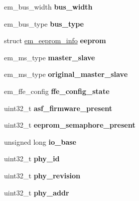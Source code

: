\begin{DoxyCompactItemize}
em\+\_\+bus\+\_\+width {\bfseries bus\+\_\+width}
\item 
\mbox{\label{structem__hw_a6da7bde3c25f0ff0b9e75e75b11d5600}} 
em\+\_\+bus\+\_\+type {\bfseries bus\+\_\+type}
\item 
\mbox{\label{structem__hw_a8843dbc44688d44c3bdb27db4dd05109}} 
struct \mbox{\hyperlink{structem__eeprom__info}{em\+\_\+eeprom\+\_\+info}} {\bfseries eeprom}
\item 
\mbox{\label{structem__hw_a1ff1b001ff9967f12b64849a5111016b}} 
em\+\_\+ms\+\_\+type {\bfseries master\+\_\+slave}
\item 
\mbox{\label{structem__hw_a926944e3b21a5b22b7fca9f1cae65ebe}} 
em\+\_\+ms\+\_\+type {\bfseries original\+\_\+master\+\_\+slave}
\item 
\mbox{\label{structem__hw_a0c2e122c5091ae47d20a25b63350f15a}} 
em\+\_\+ffe\+\_\+config {\bfseries ffe\+\_\+config\+\_\+state}
\item 
\mbox{\label{structem__hw_ae4b392a316469ee98520c93ab2c7f61c}} 
uint32\+\_\+t {\bfseries asf\+\_\+firmware\+\_\+present}
\item 
\mbox{\label{structem__hw_a86c54c3d6f9f195d990127c7e0f5650c}} 
uint32\+\_\+t {\bfseries eeprom\+\_\+semaphore\+\_\+present}
\item 
\mbox{\label{structem__hw_af637510eb8b034800af72d25332c57ac}} 
unsigned long {\bfseries io\+\_\+base}
\item 
\mbox{\label{structem__hw_a6978ab6ee8ec387dd80330a1e258dcbd}} 
uint32\+\_\+t {\bfseries phy\+\_\+id}
\item 
\mbox{\label{structem__hw_a0e3e1951ca8b1df98cf3fbc48f47785f}} 
uint32\+\_\+t {\bfseries phy\+\_\+revision}
\item 
\mbox{\label{structem__hw_ab3c3777b0ee6ef8b3a3c918f7f3fc8bb}} 
uint32\+\_\+t {\bfseries phy\+\_\+addr}
\item 
\mbox{\label{structem__hw_a11f3223aefc00915897fe12dbddc8ecc}} 

\end{DoxyCompactItemize}
